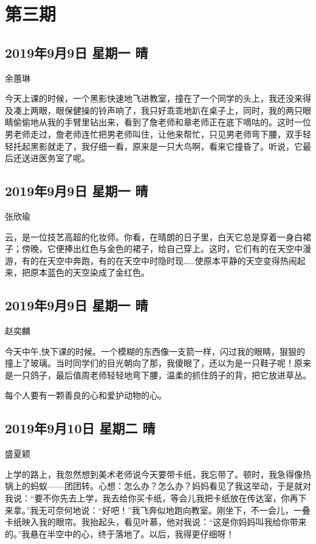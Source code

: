 \chapter{第三期}

\section{2019年9月9日 星期一 晴}

余蕙琳

今天上课的时候，一个黑影快速地飞进教室，撞在了一个同学的头上，我还没来得及凑上两眼，眼保健操的铃声响了，我只好乖乖地趴在桌子上，同时，我的两只眼睛偷偷地从我的手臂里钻出来，看到了詹老师和章老师正在底下嘀咕的。这时一位男老师走过，詹老师连忙把男老师叫住，让他来帮忙，只见男老师弯下腰，双手轻轻托起黑影就走了，我仔细一看，原来是一只大鸟啊，看来它撞昏了。听说，它最后还送进医务室了呢。

\section{2019年9月9日 星期一 晴}

张欣瑜

云，是一位技艺高超的化妆师。你看，在晴朗的日子里，白天它总是穿着一身白裙子；傍晚，它便捧出红色与金色的裙子，给自己穿上。这时，它们有的在天空中漫游，有的在天空中奔跑，有的在天空中时隐时现\ldots\ldots 使原本平静的天空变得热闹起来，把原本蓝色的天空染成了金红色。

\section{2019年9月9日 星期一 晴}

赵奕麟

今天中午,快下课的时候。一个模糊的东西像一支箭一样，闪过我的眼睛，狠狠的撞上了玻璃。当时同学们的目光朝向了那，我傻眼了，还以为是一只鞋子呢！原来是一只鸽子，最后值周老师轻轻地弯下腰，温柔的抓住鸽子的背，把它放进草丛。

每个人要有一颗善良的心和爱护动物的心。

\section{2019年9月10日 星期二 晴}

盛夏颖

上学的路上，我忽然想到美术老师说今天要带卡纸，我忘带了。顿时，我急得像热锅上的蚂蚁------团团转。心想：怎么办？怎么办？妈妈看见了我这举动，于是就对我说：``要不你先去上学，我去给你买卡纸，等会儿我把卡纸放在传达室，你再下来拿。''我无可奈何地说：``好吧！''我飞奔似地跑向教室。刚坐下，不一会儿，一叠卡纸映入我的眼帘。我抬起头，看见叶慕，他对我说：``这是你妈妈叫我给你带来的。''我悬在半空中的心，终于落地了。以后，我得更仔细呀！

